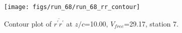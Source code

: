 \begin{figure}[H]
\centering
\texttt{[image: figs/run\_68/run\_68\_rr\_contour]}
\caption{Contour plot of $\overline{r^\prime r^\prime}$ at $z/c$=10.00, $V_{free}$=29.17, station 7.}
\label{fig:run_68_rr_contour}
\end{figure}


